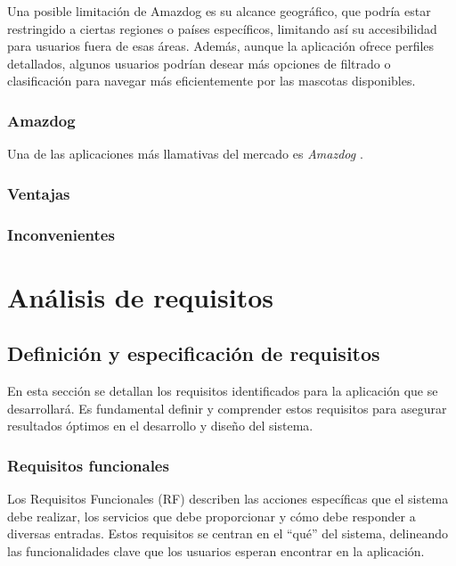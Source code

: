 \documentclass[a4paper, 12pt]{article}
\begin{document}
Una posible limitación de Amazdog es su alcance geográfico, que podría estar restringido a ciertas regiones o países específicos, limitando así su accesibilidad para usuarios fuera de esas áreas. Además, aunque la aplicación ofrece perfiles detallados, algunos usuarios podrían desear más opciones de filtrado o clasificación para navegar más eficientemente por las mascotas disponibles.


\subsubsection*{Amazdog}

Una de las aplicaciones más llamativas del mercado es \textit{Amazdog} \cite{amazdog}.

\subsubsection*{Ventajas}


\subsubsection*{Inconvenientes}




\newpage
\section{Análisis de requisitos}

\subsection{Definición y especificación de requisitos}

En esta sección se detallan los requisitos identificados para la aplicación que se desarrollará. Es fundamental definir y comprender estos requisitos para asegurar resultados óptimos en el desarrollo y diseño del sistema.

\subsubsection{Requisitos funcionales}

Los Requisitos Funcionales (RF) describen las acciones específicas que el sistema debe realizar, los servicios que debe proporcionar y cómo debe responder a diversas entradas. Estos requisitos se centran en el ``qué'' del sistema, delineando las funcionalidades clave que los usuarios esperan encontrar en la aplicación.
\end{document}
